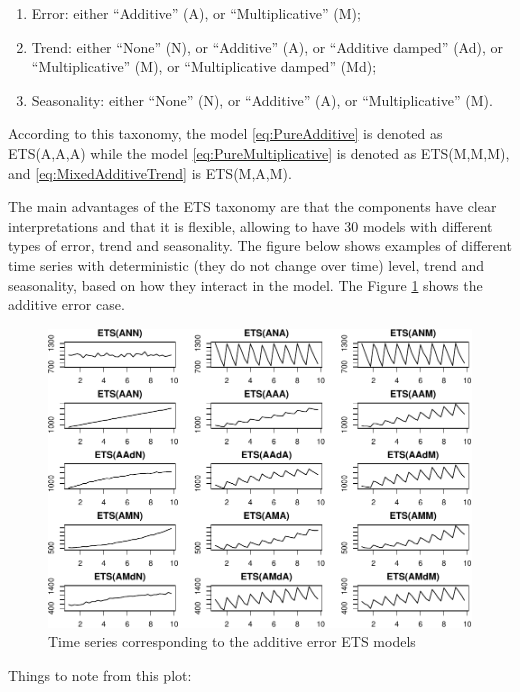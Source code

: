 \documentclass[
]{book}
\providecommand{\tightlist}{%
  \setlength{\itemsep}{0pt}\setlength{\parskip}{0pt}}
\theoremstyle{definition}
\theoremstyle{definition}
\theoremstyle{definition}
\theoremstyle{definition}
\theoremstyle{remark}
\begin{document}
\begin{enumerate}
\def\labelenumi{\arabic{enumi}.}
\tightlist
\item
  Error: either ``Additive'' (A), or ``Multiplicative'' (M);
\item
  Trend: either ``None'' (N), or ``Additive'' (A), or ``Additive damped'' (Ad), or ``Multiplicative'' (M), or ``Multiplicative damped'' (Md);
\item
  Seasonality: either ``None'' (N), or ``Additive'' (A), or ``Multiplicative'' (M).
\end{enumerate}

According to this taxonomy, the model \eqref{eq:PureAdditive} is denoted as ETS(A,A,A) while the model \eqref{eq:PureMultiplicative} is denoted as ETS(M,M,M), and \eqref{eq:MixedAdditiveTrend} is ETS(M,A,M).

The main advantages of the ETS taxonomy are that the components have clear interpretations and that it is flexible, allowing to have 30 models with different types of error, trend and seasonality. The figure below shows examples of different time series with deterministic (they do not change over time) level, trend and seasonality, based on how they interact in the model. The Figure \ref{fig:ETSTaxonomyAdditive} shows the additive error case.

\begin{figure}
\centering
\includegraphics{adam_files/figure-latex/ETSTaxonomyAdditive-1.pdf}
\caption{\label{fig:ETSTaxonomyAdditive}Time series corresponding to the additive error ETS models}
\end{figure}

Things to note from this plot:
\end{document}
